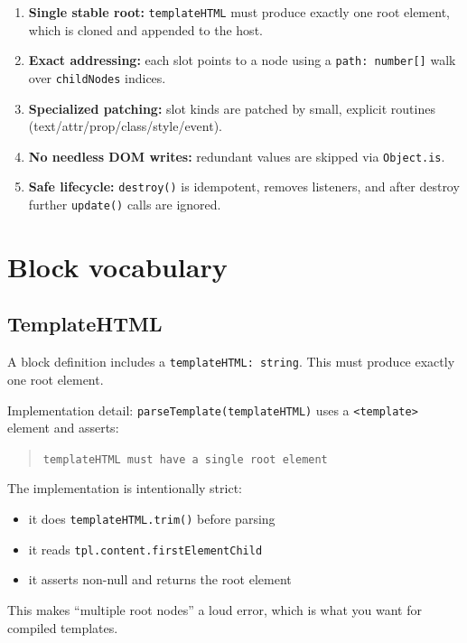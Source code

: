 \begin{enumerate}
  \item \textbf{Single stable root:} \texttt{templateHTML} must produce exactly one root element, which is cloned and appended to the host.
  \item \textbf{Exact addressing:} each slot points to a node using a \texttt{path: number[]} walk over \texttt{childNodes} indices.
  \item \textbf{Specialized patching:} slot kinds are patched by small, explicit routines (text/attr/prop/class/style/event).
  \item \textbf{No needless DOM writes:} redundant values are skipped via \texttt{Object.is}.
  \item \textbf{Safe lifecycle:} \texttt{destroy()} is idempotent, removes listeners, and after destroy further \texttt{update()} calls are ignored.
\end{enumerate}

\section{Block vocabulary}

\subsection{TemplateHTML}

A block definition includes a \texttt{templateHTML: string}.
This must produce exactly one root element.

Implementation detail: \texttt{parseTemplate(templateHTML)} uses a \texttt{<template>} element and asserts:

\begin{quote}
\texttt{templateHTML must have a single root element}
\end{quote}

The implementation is intentionally strict:

\begin{itemize}
  \item it does \texttt{templateHTML.trim()} before parsing
  \item it reads \texttt{tpl.content.firstElementChild}
  \item it asserts non-null and returns the root element
\end{itemize}

This makes “multiple root nodes” a loud error, which is what you want for compiled templates.


